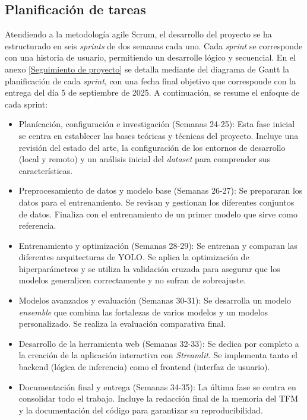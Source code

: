 \documentclass[12pt,a4paper,onecolumn,oneside]{report}
\begin{document}
\subsection{Planificación de tareas}
\label{Planificación de tareas}

Atendiendo a la metodología agile Scrum, el desarrollo del proyecto se ha estructurado en seis \textit{sprints} de dos semanas cada uno.
Cada \textit{sprint} se corresponde con una historia de usuario, permitiendo un desarrolle lógico y secuencial.
En el anexo \autoref{Seguimiento de proyecto} se detalla mediante del diagrama de Gantt \cite{OnlineGantt2025} la planificación de cada \textit{sprint}, con una fecha final objetivo que corresponde con la entrega del día 5 de septiembre de 2025.
A continuación, se resume el enfoque de cada sprint:

\begin{itemize}[label=-]
  \item Planícación, configuración e investigación (Semanas 24-25): Esta fase inicial se centra en establecer las bases teóricas y técnicas del proyecto. Incluye una revisión del estado del arte, la configuración de los entornos de desarrollo (local y remoto) y un análisis inicial del \textit{dataset} para comprender sus características.
  
  \item Preprocesamiento de datos y modelo base (Semanas 26-27): Se prepararan los datos para el entrenamiento. Se revisan y gestionan los diferentes conjuntos de datos. Finaliza con el entrenamiento de un primer modelo que sirve como referencia.
  
  \item Entrenamiento y optimización (Semanas 28-29): Se entrenan y comparan las diferentes arquitecturas de YOLO. Se aplica la optimización de hiperparámetros y se utiliza la validación cruzada para asegurar que los modelos generalicen correctamente y no sufran de sobreajuste.
  
  \item Modelos avanzados y evaluación (Semanas 30-31): Se desarrolla un modelo \textit{ensemble} que combina las fortalezas de varios modelos y un modelos personalizado. Se realiza la evaluación comparativa final.
  
  \item Desarrollo de la herramienta web (Semanas 32-33): Se dedica por completo a la creación de la aplicación interactiva con \textit{Streamlit}. Se implementa tanto el backend (lógica de inferencia) como el frontend (interfaz de usuario).
  
  \item Documentación final y entrega (Semanas 34-35): La última fase se centra en consolidar todo el trabajo. Incluye la redacción final de la memoria del TFM y la documentación del código para garantizar su reproducibilidad.
\end{itemize}
\end{document}
